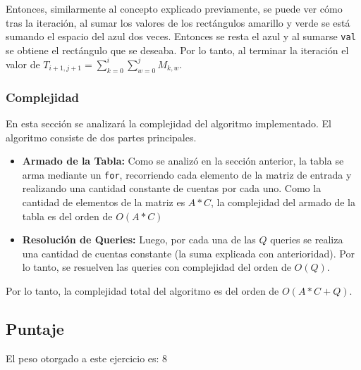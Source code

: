Entonces, similarmente al concepto explicado previamente, se puede ver cómo tras la iteración, al sumar los valores de los rectángulos amarillo y verde se está sumando el espacio del azul dos veces. Entonces se resta el azul y al sumarse \texttt{val} se obtiene el rectángulo que se deseaba. Por lo tanto, al terminar la iteración el valor de $T_{i+1,j+1} = \sum_{k=0}^{i} \sum_{w=0}^{j} M_{k,w}$. 

\subsubsection{Complejidad}

En esta sección se analizará la complejidad del algoritmo implementado. El algoritmo consiste de dos partes principales.

\begin{itemize}
    \item \textbf{Armado de la Tabla:} Como se analizó en la sección anterior, la tabla se arma mediante un \texttt{for}, recorriendo cada elemento de la matriz de entrada y realizando una cantidad constante de cuentas por cada uno. Como la cantidad de elementos de la matriz es $A*C$, la complejidad del armado de la tabla es del orden de $O(A*C)$
    \item \textbf{Resolución de Queries:} Luego, por cada una de las $Q$ queries se realiza una cantidad de cuentas constante (la suma explicada con anterioridad). Por lo tanto, se resuelven las queries con complejidad del orden de $O(Q)$.
\end{itemize}

Por lo tanto, la complejidad total del algoritmo es del orden de $O(A*C + Q)$.

\subsection{Puntaje}
El peso otorgado a este ejercicio es: 8
